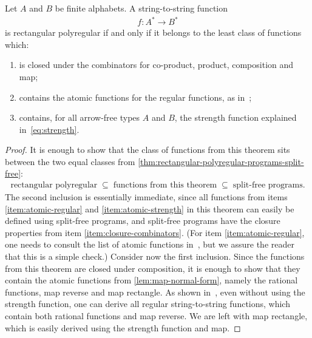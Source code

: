 \documentclass[a4paper,UKenglish,cleveref, autoref, thm-restate]{lipics-v2021}
\begin{document}
\begin{theorem}
    Let $A$ and $B$ be finite alphabets. A string-to-string function
    \begin{align*}
    f : A^* \to B^*
    \end{align*}
    is rectangular polyregular if and only if it belongs to the least class of functions which:
    \begin{enumerate}
        \item \label{item:closure-combinators} is closed under the combinators for co-product, product, composition and map;
        \item \label{item:atomic-regular} contains the atomic functions for the regular functions, as  in~\cite[Section 6]{bojanczykRegularFirstOrderList2018};
        \item \label{item:atomic-strength} contains, for all arrow-free types $A$ and $B$, the strength function explained in~\eqref{eq:strength}.
        
    \end{enumerate}
\end{theorem}
\begin{proof}
    It is enough to show that the class of functions from this theorem sits between the two equal classes from 
    \cref{thm:rectangular-polyregular-programs-split-free}:
    \begin{align*}
        \text{rectangular polyregular} 
    \; \subseteq \;
    \text{functions from this theorem}
    \; \subseteq \;
    \text{split-free programs}.
    \end{align*}
    The second inclusion is essentially immediate, since all functions from items \ref{item:atomic-regular} and \ref{item:atomic-strength} in this theorem can easily be defined using split-free programs, and split-free programs have the closure properties from item \ref{item:closure-combinators}. (For item \ref{item:atomic-regular}, one needs to consult the list of atomic functions in~\cite{bojanczykRegularFirstOrderList2018}, but we assure the reader that this is a simple check.) 
    Consider now the first inclusion. Since the functions from this theorem are closed under composition, it is enough to show that they contain the atomic functions from \cref{lem:map-normal-form}, namely the rational functions, map reverse and map rectangle. As shown in~\cite[Theorem 6.1]{bojanczykRegularFirstOrderList2018}, even without using the strength function, one can derive all regular string-to-string  functions, which contain both rational functions and map reverse. We are left with map rectangle, which is easily derived using the strength function and map.
\end{proof}
\end{document}
